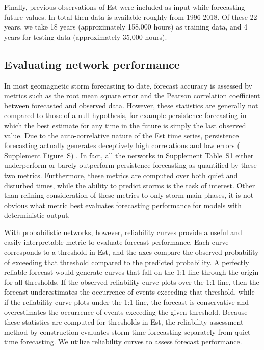 \documentclass[draft,linenumbers]{agujournal2018}
\begin{document}
Finally, previous observations of Est were included as input while forecasting future values. In total then data is available roughly from 1996  2018. Of these 22 years, we take 18 years (approximately 158,000 hours) as training data, and 4 years for testing data (approximately 35,000 hours).


\subsection{Evaluating network performance}
In most geomagnetic storm forecasting to date, forecast accuracy is assessed by metrics such as the root mean square error and the Pearson correlation coefficient between forecasted and observed data. However, these statistics are generally not compared to those of a null hypothesis, for example persistence forecasting in which the best estimate for any time in the future is simply the last observed value. Due to the auto-correlative nature of the Est time series, persistence forecasting actually generates deceptively high correlations and low errors ( Supplement Figure~S) \citep{Shprits2019}. In fact, all the networks in Supplement Table~S1 either underperform or barely outperform persistence forecasting as quantified by these two metrics. Furthermore, these metrics are computed over both quiet and disturbed times, while the ability to predict storms is the task of interest. Other than refining consideration of these metrics to only storm main phases, it is not obvious what metric best evaluates forecasting performance for models with deterministic output. 

With probabilistic networks, however, reliability curves provide a useful and easily interpretable metric to evaluate forecast performance. Each curve corresponds to a threshold in Est, and the axes compare the observed probability of exceeding that threshold compared to the predicted probability. A perfectly reliable forecast would generate curves that fall on the 1:1 line through the origin for all thresholds. If the observed reliability curve plots over the 1:1 line, then the forecast underestimates the occurrence of events exceeding that threshold, while if the reliability curve plots under the 1:1 line, the forecast is conservative and overestimates the occurrence of events exceeding the given threshold. Because these statistics are computed for thresholds in Est, the reliability assessment method by construction evaluates storm time forecasting separately from quiet time forecasting. We utilize reliability curves to assess forecast performance. 
\end{document}

